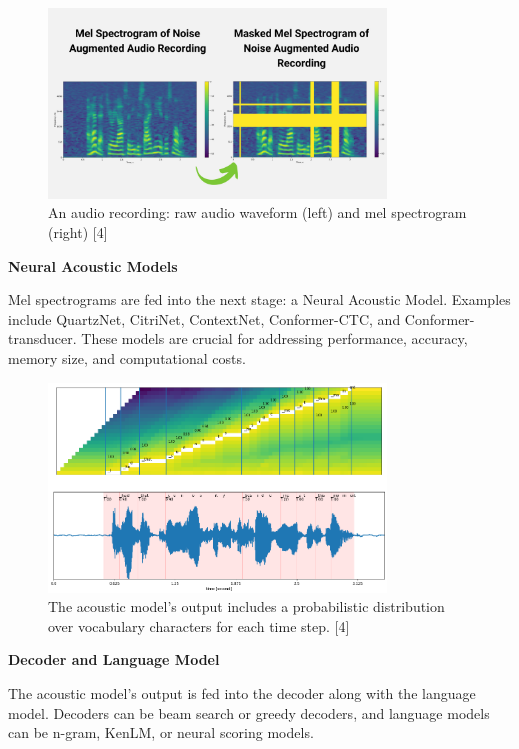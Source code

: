 \begin{figure}[ht]
    \centering
    \includegraphics[width=0.8\textwidth]{Figure2.2.png}
    \caption{An audio recording: raw audio waveform (left) and mel spectrogram (right) [4]}
    \label{fig:mel-spectrogram}
\end{figure}

\textbf{Neural Acoustic Models}

Mel spectrograms are fed into the next stage: a Neural Acoustic Model. Examples include QuartzNet, CitriNet, ContextNet, Conformer-CTC, and Conformer-transducer. These models are crucial for addressing performance, accuracy, memory size, and computational costs.

\begin{figure}[ht]
    \centering
    \includegraphics[width=0.8\textwidth]{Figure2.3.png}
    \caption{The acoustic model’s output includes a probabilistic distribution over vocabulary characters for each time step. [4]}
    \label{fig:acoustic-model-output}
\end{figure}

\textbf{Decoder and Language Model}

The acoustic model's output is fed into the decoder along with the language model. Decoders can be beam search or greedy decoders, and language models can be n-gram, KenLM, or neural scoring models.

